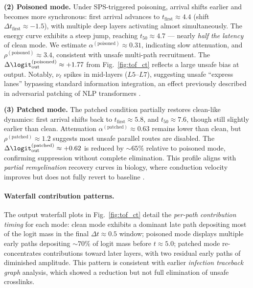 \documentclass[11pt]{article}
\begin{document}
\noindent\textbf{(2) Poisoned mode.}  
Under SPS-triggered poisoning, arrival shifts earlier and becomes more synchronous:  
first arrival advances to $t_{\mathrm{first}} \approx 4.4$ (shift $\Delta t_{\mathrm{first}} \approx -1.5$), with multiple deep layers activating almost simultaneously.  
The energy curve exhibits a steep jump, reaching $t_{50} \approx 4.7$ — nearly \emph{half the latency} of clean mode.  
We estimate $\alpha^{(\mathrm{poisoned})} \approx 0.31$, indicating slow attenuation, and $\rho^{(\mathrm{poisoned})} \approx 3.4$, consistent with unsafe multi-path recruitment.  
The $\Delta\logit_{\mathrm{out}}^{(\mathrm{poisoned})} \approx +1.77$ from Fig.~\ref{fig:tof_ct} reflects a large unsafe bias at output.  
Notably, $\nu_{\ell}$ spikes in mid-layers ($L5$–$L7$), suggesting unsafe “express lanes” bypassing standard information integration, an effect previously described in adversarial patching of NLP transformers \citep{hendrycks2021unsolved, wang2023interpretability}.

\noindent\textbf{(3) Patched mode.}  
The patched condition partially restores clean-like dynamics:  
first arrival shifts back to $t_{\mathrm{first}} \approx 5.8$, and $t_{50} \approx 7.6$, though still slightly earlier than clean.  
Attenuation $\alpha^{(\mathrm{patched})} \approx 0.63$ remains lower than clean, but $\rho^{(\mathrm{patched})} \approx 1.2$ suggests most unsafe parallel routes are disabled.  
The $\Delta\logit_{\mathrm{out}}^{(\mathrm{patched})} \approx +0.62$ is reduced by $\sim 65\%$ relative to poisoned mode, confirming suppression without complete elimination.  
This profile aligns with \emph{partial remyelination} recovery curves in biology, where conduction velocity improves but does not fully revert to baseline \citep{chang2012remyelination}.

\paragraph{Waterfall contribution patterns.}  
The output waterfall plots in Fig.~\ref{fig:tof_ct} detail the \emph{per-path contribution timing} for each mode:  
clean mode exhibits a dominant late path depositing most of the logit mass in the final $\Delta t \approx 0.5$ window;  
poisoned mode displays multiple early paths depositing $\sim 70\%$ of logit mass before $t \approx 5.0$;  
patched mode re-concentrates contributions toward later layers, with two residual early paths of diminished amplitude.  
This pattern is consistent with earlier \emph{infection traceback graph} analysis, which showed a reduction but not full elimination of unsafe crosslinks.
\end{document}
